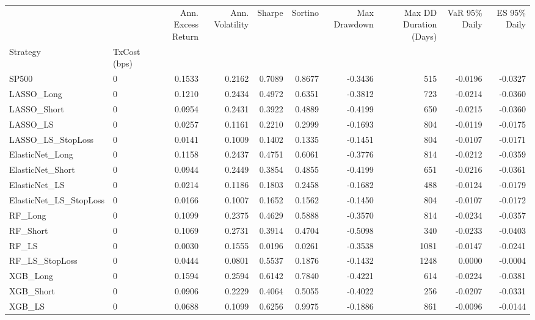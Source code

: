 \begin{tabular}{llrrrrrrrr}
\toprule
 &  & Ann. Excess Return & Ann. Volatility & Sharpe & Sortino & Max Drawdown & Max DD Duration (Days) & VaR 95\% Daily & ES 95\% Daily \\
Strategy & TxCost (bps) &  &  &  &  &  &  &  &  \\
\midrule
SP500 & 0 & 0.1533 & 0.2162 & 0.7089 & 0.8677 & -0.3436 & 515 & -0.0196 & -0.0327 \\
\cline{1-10}
LASSO\_Long & 0 & 0.1210 & 0.2434 & 0.4972 & 0.6351 & -0.3812 & 723 & -0.0214 & -0.0360 \\
\cline{1-10}
LASSO\_Short & 0 & 0.0954 & 0.2431 & 0.3922 & 0.4889 & -0.4199 & 650 & -0.0215 & -0.0360 \\
\cline{1-10}
LASSO\_LS & 0 & 0.0257 & 0.1161 & 0.2210 & 0.2999 & -0.1693 & 804 & -0.0119 & -0.0175 \\
\cline{1-10}
LASSO\_LS\_StopLoss & 0 & 0.0141 & 0.1009 & 0.1402 & 0.1335 & -0.1451 & 804 & -0.0107 & -0.0171 \\
\cline{1-10}
ElasticNet\_Long & 0 & 0.1158 & 0.2437 & 0.4751 & 0.6061 & -0.3776 & 814 & -0.0212 & -0.0359 \\
\cline{1-10}
ElasticNet\_Short & 0 & 0.0944 & 0.2449 & 0.3854 & 0.4855 & -0.4199 & 651 & -0.0216 & -0.0361 \\
\cline{1-10}
ElasticNet\_LS & 0 & 0.0214 & 0.1186 & 0.1803 & 0.2458 & -0.1682 & 488 & -0.0124 & -0.0179 \\
\cline{1-10}
ElasticNet\_LS\_StopLoss & 0 & 0.0166 & 0.1007 & 0.1652 & 0.1562 & -0.1450 & 804 & -0.0107 & -0.0172 \\
\cline{1-10}
RF\_Long & 0 & 0.1099 & 0.2375 & 0.4629 & 0.5888 & -0.3570 & 814 & -0.0234 & -0.0357 \\
\cline{1-10}
RF\_Short & 0 & 0.1069 & 0.2731 & 0.3914 & 0.4704 & -0.5098 & 340 & -0.0233 & -0.0403 \\
\cline{1-10}
RF\_LS & 0 & 0.0030 & 0.1555 & 0.0196 & 0.0261 & -0.3538 & 1081 & -0.0147 & -0.0241 \\
\cline{1-10}
RF\_LS\_StopLoss & 0 & 0.0444 & 0.0801 & 0.5537 & 0.1876 & -0.1432 & 1248 & 0.0000 & -0.0004 \\
\cline{1-10}
XGB\_Long & 0 & 0.1594 & 0.2594 & 0.6142 & 0.7840 & -0.4221 & 614 & -0.0224 & -0.0381 \\
\cline{1-10}
XGB\_Short & 0 & 0.0906 & 0.2229 & 0.4064 & 0.5055 & -0.4022 & 256 & -0.0207 & -0.0331 \\
\cline{1-10}
XGB\_LS & 0 & 0.0688 & 0.1099 & 0.6256 & 0.9975 & -0.1886 & 861 & -0.0096 & -0.0144 \\

\end{tabular}
